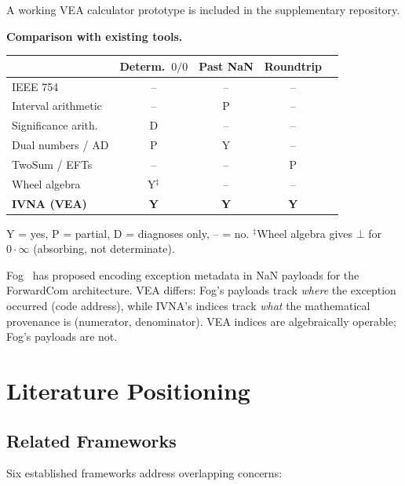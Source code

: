 \documentclass[12pt]{article}
\theoremstyle{definition}
\theoremstyle{remark}
\begin{document}
A working VEA calculator prototype is included in the supplementary
repository.

\medskip
\noindent\textbf{Comparison with existing tools.}

\begin{center}
\begin{tabular}{lcccc}
\toprule
& \textbf{Determ.\ $0/0$} & \textbf{Past NaN} & \textbf{Roundtrip} \\
\midrule
IEEE 754              & --  & --  & -- \\
Interval arithmetic   & --  & P   & -- \\
Significance arith.   & D   & --  & -- \\
Dual numbers / AD     & P   & Y   & -- \\
TwoSum / EFTs         & --  & --  & P \\
Wheel algebra         & Y$^\ddagger$   & --  & -- \\
\textbf{IVNA (VEA)}   & \textbf{Y} & \textbf{Y} & \textbf{Y} \\
\bottomrule
\end{tabular}
\end{center}

{\small Y = yes, P = partial, D = diagnoses only, -- = no.
$^\ddagger$Wheel algebra gives $\bot$ for $0 \cdot \infty$
(absorbing, not determinate).}

\medskip
Fog~\cite{fog2019} has proposed encoding exception metadata in NaN
payloads for the ForwardCom architecture. VEA differs: Fog's payloads
track \emph{where} the exception occurred (code address), while IVNA's
indices track \emph{what} the mathematical provenance is (numerator,
denominator). VEA indices are algebraically operable; Fog's payloads
are not.


\section{Literature Positioning}
\label{sec:literature}

\subsection{Related Frameworks}

Six established frameworks address overlapping concerns:
\end{document}
